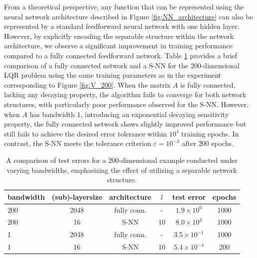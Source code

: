 \documentclass{article}
\begin{document}
From a theoretical perspective, any function that can be represented using the neural network architecture described in Figure \ref{fig:NN_architecture} can also be represented by a standard feedforward neural network with one hidden layer. However, by explicitly encoding the separable structure within the network architecture, we observe a significant improvement in training performance compared to a fully connected feedforward network. Table \ref{tab:200dim} provides a brief comparison of a fully connected network and a S-NN for the $200$-dimensional LQR problem using the same training parameters as in the experiment corresponding to Figure \ref{fig:V_200}. When the matrix \( A \) is fully connected, lacking any decaying property, the algorithm fails to converge for both network structures, with particularly poor performance observed for the S-NN. However, when \( A \) has bandwidth \( 1 \), introducing an exponential decaying sensitivity property, the fully connected network shows slightly improved performance but still fails to achieve the desired error tolerance within $10^4$ training epochs. In contrast, the S-NN meets the tolerance criterion $\varepsilon = 10^{-3}$ after {$200$} epochs.

\begin{table}[h!]
	\centering
	\begin{tabular}{lccccc}
		\toprule
		\textbf{bandwidth} & \textbf{(sub)-layersize} & \textbf{architecture} & {\textbf{$l$}} & \textbf{test error} & \textbf{epochs} \\
		\midrule
		200  & 2048  & fully conn. & - & $ {1.9} \times 10^0 $ & 1000 \\
		200  & 16 & S-NN & 10 & $8.0 \times 10^3$ & 1000 \\ 
		1  & 2048 & fully conn. & - &  ${3.5} \times 10^{-1}$ & 1000 \\ 
        1  & 16 & S-NN & 10 & ${5.4} \times 10^{-4}$ & {200} \\ 
		\bottomrule
	\end{tabular}
	\caption{A comparison of test errors for a $200$-dimensional example conducted under varying bandwidths, emphasizing the effect of utilizing a separable network structure.}
    \label{tab:200dim}
\end{table}
\end{document}
